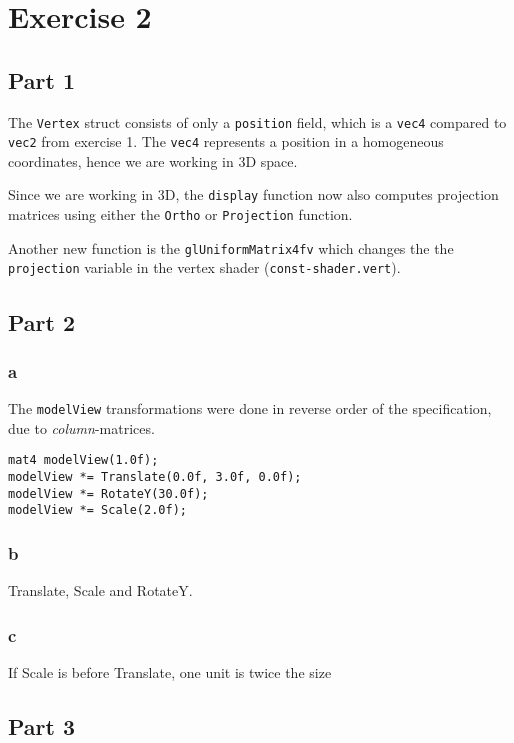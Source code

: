 \section{Exercise 2}

\subsection{Part 1}
The \texttt{Vertex} struct consists of only a \texttt{position} field, which is a \texttt{vec4} compared to \texttt{vec2} from exercise 1. The \texttt{vec4} represents a position in a homogeneous coordinates, hence we are working in 3D space.

Since we are working in 3D, the \texttt{display} function now also computes projection matrices using either the \texttt{Ortho} or \texttt{Projection} function.

Another new function is the \texttt{glUniformMatrix4fv} which changes the the \texttt{projection} variable in the vertex shader (\texttt{const-shader.vert}).

\subsection{Part 2}
\subsubsection{a}
The \texttt{modelView} transformations were done in reverse order of the specification, due to \textit{column}-matrices.

\begin{lstlisting}
mat4 modelView(1.0f);
modelView *= Translate(0.0f, 3.0f, 0.0f);
modelView *= RotateY(30.0f);
modelView *= Scale(2.0f);
\end{lstlisting}


\subsubsection{b}
Translate, Scale and RotateY.

\subsubsection{c}
If Scale is before Translate, one unit is twice the size

\subsection{Part 3}

